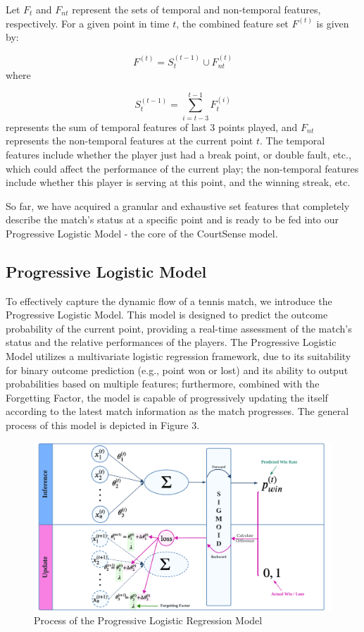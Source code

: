 \documentclass[12pt]{article}  %
\begin{document}
Let \( F_{t} \) and \( F_{nt} \) represent the sets of temporal and non-temporal features, respectively. For a given point in time \( t \), the combined feature set \( F^{(t)} \) is given by:

\[
F^{(t)} = S_{t}^{(t-1)} \cup F_{nt}^{(t)}
\]
where

\[
S_{t}^{(t-1)} = \sum_{i=t-3}^{t-1} F_{t}^{(i)}
\]
represents the sum of temporal features of last 3 points played, and \( F_{nt} \) represents the non-temporal features at the current point \( t \). The temporal features include whether the player just had a break point, or double fault, etc., which could affect the performance of the current play; the non-temporal features include whether this player is serving at this point, and the winning streak, etc.

So far, we have acquired a granular and exhaustive set features that completely describe the match's status at a specific point and is ready to be fed into our Progressive Logistic Model - the core of the CourtSense model.

\subsection{Progressive Logistic Model}
To effectively capture the dynamic flow of a tennis match, we introduce the Progressive Logistic Model. This model is designed to predict the outcome probability of the current point, providing a real-time assessment of the match's status and the relative performances of the players. The Progressive Logistic Model utilizes a multivariate logistic regression framework, due to its suitability for binary outcome prediction (e.g., point won or lost) and its ability to output probabilities based on multiple features; furthermore, combined with the Forgetting Factor, the model is capable of progressively updating the itself according to the latest match information as the match progresses. The general process of this model is depicted in Figure 3. 

\begin{figure}[htbp]  %
	\centering  %
	\includegraphics[width=.9\textwidth]{logistic.png} %
	\caption{Process of the Progressive Logistic Regression Model} %
\end{figure}
\vspace{-0.8cm}
\end{document}
